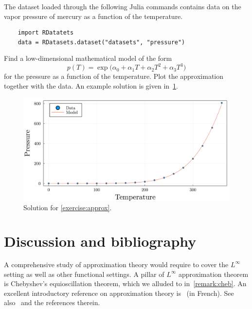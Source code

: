 \begin{compexercise}
    \label{exercise:approx}
    The dataset loaded through the following Julia commands contains data on the vapor pressure of mercury as a function of the temperature.
    \begin{verbatim}
    import RDatatets
    data = RDatasets.dataset("datasets", "pressure")
    \end{verbatim}
    Find a low-dimensional mathematical model of the form
    \begin{equation}
        p(T) = \exp \bigl( \alpha_0 + \alpha_1 T + \alpha_2 T^2 + \alpha_3 T^3 \bigr)
    \end{equation}
    for the pressure as a function of the temperature.
    Plot the approximation together with the data.
    An example solution is given in~\cref{fig:pressure}.
    \begin{figure}[ht]
        \centering
        \includegraphics[width=0.75\linewidth]{figures/pressure_model.pdf}
        \caption{Solution for \cref{exercise:approx}.}%
        \label{fig:pressure}
    \end{figure}
\end{compexercise}

\section{Discussion and bibliography}
A comprehensive study of approximation theory would require to cover the $L^{\infty}$ setting
as well as other functional settings.
A pillar of $L^{\infty}$ approximation theorem is Chebyshev's equioscillation theorem, which we alluded to in~\cref{remark:cheb}.
An excellent introductory reference on approximation theory is~\cite{magnus} (in French).
See also~\cite[Chapter 10]{MR2265914} and the references therein.
